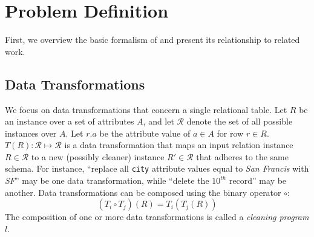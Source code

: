 \section{Problem Definition}
First, we overview the basic formalism of \sys and present its relationship to related work.

\subsection{Data Transformations}
We focus on data transformations that concern a single relational table. 
Let $R$ be an instance over a set of attributes $A$, and let $\mathcal{R}$ denote the set of all possible instances over $A$.
Let $r.a$ be the attribute value of $a \in A$ for row $r \in R$.
$T(R): \mathcal{R} \mapsto \mathcal{R}$ is a data transformation that maps an input relation instance $R \in \mathcal{R}$ to a new (possibly cleaner) instance $R' \in \mathcal{R}$ that adheres to the same schema.  For instance, ``replace all \texttt{city} attribute values equal to {\it San Francis} with {\it SF}'' may be one data transformation, while ``delete the $10^{th}$ record'' may be another.   Data transformations can be composed using the binary operator $\circ$:
\[
(T_i \circ T_j)(R) =  T_i(T_j(R))
\]
The composition of one or more data transformations is called a {\it cleaning program} $l$.   

